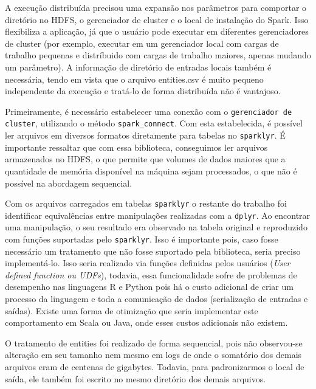 A execução distribuída precisou uma expansão nos parâmetros para comportar o 
diretório no HDFS, o gerenciador de cluster e o local de instalação do Spark. 
Isso flexibiliza a aplicação, já que o usuário pode executar em diferentes 
gerenciadores de cluster (por exemplo, executar em um gerenciador local com 
cargas de trabalho pequenas e distríbuido com cargas de trabalho maiores, apenas 
mudando um parâmetro). A informação de diretório de entradas locais também é 
necessária, tendo em vista que o arquivo entities.csv é muito pequeno 
independente da execução e tratá-lo de forma distribuída não é vantajoso.

Primeiramente, é necessário estabelecer uma conexão com o \texttt{gerenciador 
de cluster}, utilizando o método \texttt{spark\_connect}. Com esta 
estabelecida, é possível ler arquivos em diversos formatos diretamente para 
tabelas no \texttt{sparklyr}. É importante ressaltar que com essa biblioteca, 
conseguimos ler arquivos armazenados no HDFS, o que permite que volumes de 
dados maiores que a quantidade de memória disponível na máquina sejam 
processados, o que não é possível na abordagem sequencial.

Com os arquivos carregados em tabelas \texttt{sparklyr} o restante do trabalho 
foi identificar equivalências entre manipulações realizadas com a 
\texttt{dplyr}. Ao encontrar uma manipulação, o seu resultado era observado na 
tabela original e reproduzido com funções suportadas pelo \texttt{sparklyr}. 
Isso é importante pois, caso fosse necessário um tratamento que não fosse 
suportado pela biblioteca, seria preciso implementá-lo. Isso seria realizado 
via funções definidas pelos usuários (\emph{User defined function ou UDFs}), 
todavia, essa funcionalidade sofre de problemas de desempenho nas linguagens R 
e Python pois há o custo adicional de criar um processo da linguagem e toda a 
comunicação de dados (serialização de entradas e saídas). Existe uma forma de 
otimização que seria implementar este comportamento em Scala ou Java, onde 
esses custos adicionais não existem.




O tratamento de entities foi realizado de forma sequencial, pois não 
observou-se alteração em seu tamanho nem mesmo em logs de onde o somatório dos 
demais arquivos eram de centenas de gigabytes. Todavia, para padronizarmos o 
local de saída, ele também foi escrito no mesmo diretório dos demais arquivos.





